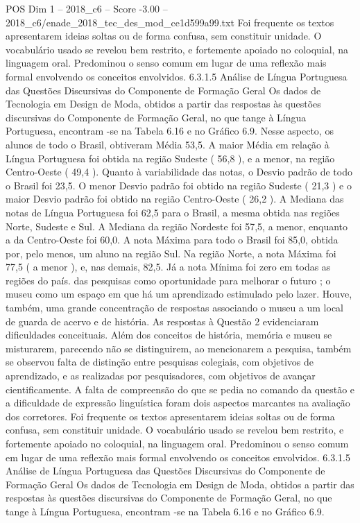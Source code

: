 \begin{textsample}{POS Dim 1 – 2018\_c6 – Score -3.00 – 2018\_c6/enade\_2018\_tec\_des\_mod\_ce1d599a99.txt}
Foi frequente os textos apresentarem ideias soltas ou de forma confusa, sem constituir unidade.
O vocabulário usado se revelou bem restrito, e fortemente apoiado no coloquial, na linguagem oral.
Predominou o senso comum em lugar de uma reflexão mais formal envolvendo os conceitos envolvidos. 6.3.1.5 Análise de Língua Portuguesa das Questões Discursivas do Componente de Formação Geral Os dados de Tecnologia em Design de Moda, obtidos a partir das respostas às questões discursivas do Componente de Formação Geral, no que tange à Língua Portuguesa, encontram -se na Tabela 6.16 e no Gráfico 6.9.
Nesse aspecto, os alunos de todo o Brasil, obtiveram Média 53,5.
A maior Média em relação à Língua Portuguesa foi obtida na região Sudeste ( 56,8 ), e a menor, na região Centro-Oeste ( 49,4 ).
Quanto à variabilidade das notas, o Desvio padrão de todo o Brasil foi 23,5.
O menor Desvio padrão foi obtido na região Sudeste ( 21,3 ) e o maior Desvio padrão foi obtido na região Centro-Oeste ( 26,2 ).
A Mediana das notas de Língua Portuguesa foi 62,5 para o Brasil, a mesma obtida nas regiões Norte, Sudeste e Sul.
A Mediana da região Nordeste foi 57,5, a menor, enquanto a da Centro-Oeste foi 60,0.
A nota Máxima para todo o Brasil foi 85,0, obtida por, pelo menos, um aluno na região Sul.
Na região Norte, a nota Máxima foi 77,5 ( a menor ), e, nas demais, 82,5.
Já a nota Mínima foi zero em todas as regiões do país. das pesquisas como oportunidade para melhorar o futuro ; o museu como um espaço em que há um aprendizado estimulado pelo lazer.
Houve, também, uma grande concentração de respostas associando o museu a um local de guarda de acervo e de história.
As respostas à Questão 2 evidenciaram dificuldades conceituais.
Além dos conceitos de história, memória e museu se misturarem, parecendo não se distinguirem, ao mencionarem a pesquisa, também se observou falta de distinção entre pesquisas colegiais, com objetivos de aprendizado, e as realizadas por pesquisadores, com objetivos de avançar cientificamente.
A falta de compreensão do que se pedia no comando da questão e a dificuldade de expressão linguística foram dois aspectos marcantes na avaliação dos corretores.
Foi frequente os textos apresentarem ideias soltas ou de forma confusa, sem constituir unidade.
O vocabulário usado se revelou bem restrito, e fortemente apoiado no coloquial, na linguagem oral.
Predominou o senso comum em lugar de uma reflexão mais formal envolvendo os conceitos envolvidos. 6.3.1.5 Análise de Língua Portuguesa das Questões Discursivas do Componente de Formação Geral Os dados de Tecnologia em Design de Moda, obtidos a partir das respostas às questões discursivas do Componente de Formação Geral, no que tange à Língua Portuguesa, encontram -se na Tabela 6.16 e no Gráfico 6.9.

\end{textsample}

